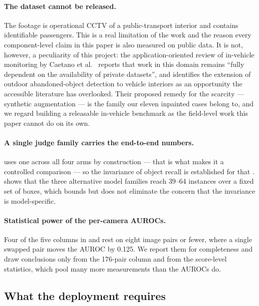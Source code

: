 \paragraph{The dataset cannot be released.}
The footage is operational CCTV of a public-transport interior and contains
identifiable passengers. This is a real limitation of the work and the reason
every component-level claim in this paper is also measured on public data. It
is not, however, a peculiarity of this project: the application-oriented review
of in-vehicle monitoring by Caetano et al.~\cite{Caetano_2022} reports that
work in this domain remains ``fully dependent on the availability of private
datasets'', and identifies the extension of outdoor abandoned-object detection
to vehicle interiors as an opportunity the accessible literature has
overlooked. Their proposed remedy for the scarcity --- synthetic augmentation
--- is the family our eleven inpainted cases belong to, and we regard building
a releasable in-vehicle benchmark as the field-level work this paper cannot do
on its own.

\paragraph{A single judge family carries the end-to-end numbers.}
 uses one \judge{} across all four arms by construction ---
that is what makes it a controlled comparison --- so the invariance of object
recall is established for that \judge{}.  shows that the
three alternative model families reach 39--64 instances over a fixed set of
boxes, which bounds but does not eliminate the concern that the invariance is
model-specific.

\paragraph{Statistical power of the per-camera AUROCs.}
Four of the five columns in  and
 rest on eight image pairs or fewer, where a single
swapped pair moves the AUROC by 0.125. We report them for completeness and
draw conclusions only from the 176-pair column and from the score-level
statistics, which pool many more measurements than the AUROCs do.

\subsection{What the deployment requires}

